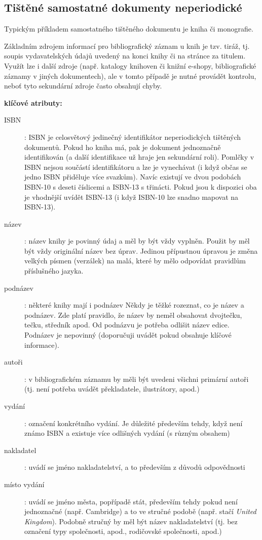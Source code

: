 \documentclass[male,czech,api_bc]{kitheses}
\begin{document}
\subsection{Tištěné samostatné dokumenty neperiodické}

Typickým příkladem samostatného tištěného dokumentu je kniha či monografie.

Základním zdrojem informací pro bibliografický záznam u knih je tzv. tiráž, tj. soupis vydavatelských údajů uvedený na konci knihy či na stránce za titulem. Využít lze i další zdroje (např. katalogy knihoven či knižní e-shopy, bibliografické záznamy v jiných dokumentech), ale v tomto případě je nutné provádět kontrolu, neboť tyto sekundární zdroje často obsahují chyby.

\textbf{klíčové atributy:}

\begin{description}
\item[ISBN]: ISBN je celosvětový jedinečný identifikátor neperiodických tištěných dokumentů. Pokud ho kniha má, pak je dokument jednoznačně identifikován (a další identifikace už hraje jen sekundární roli). Pomlčky v ISBN nejsou součástí identifikátoru a lze je vynechávat (i když občas se jedno ISBN přiděluje více svazkům). Navíc existují ve dvou podobách ISBN-10 s deseti číslicemi a ISBN-13 s třinácti. Pokud jsou k dispozici oba je vhodnější uvídět ISBN-13 (i když ISBN-10 lze snadno mapovat na ISBN-13).
\item[název]: název knihy je povinný údaj a měl by být vždy vyplněn. Použit by měl být vždy originální název bez úprav. Jedinou přípustnou úpravou je změna velkých písmen (verzálek) na malá, které by mělo odpovídat pravidlům příslušného jazyka.
\item[podnázev]: některé knihy mají i podnázev Někdy je těžké rozeznat, co je název a podnázev. Zde platí pravidlo, že název by neměl obsahovat dvojtečku, tečku, středník apod. Od podnázvu je potřeba odlišit název edice. Podnázev je nepovinný (doporučuji uvádět pokud obsahuje klíčové informace).
\item[autoři]: v bibliografickém záznamu by měli být uvedeni všichni primární autoři (tj. není potřeba uvádět překladatele, ilustrátory, apod.)
\item[vydání]: označení konkrétního vydání. Je důležité především tehdy, když není známo ISBN a existuje více odlišných vydání (s různým obsahem)
\item[nakladatel]: uvádí se jméno nakladatelství, a to především z důvodů odpovědnosti
\item[místo vydání]: uvádí se jméno města, popřípadě stát, především tehdy pokud není jednoznačné (např. Cambridge) a to ve stručné podobě (např. stačí \textit{United Kingdom}).  Podobně stručný by měl být název nakladatelství (tj. bez označení typy společnosti, apod., rodičovské společnosti, apod.)

\end{description}
\end{document}
